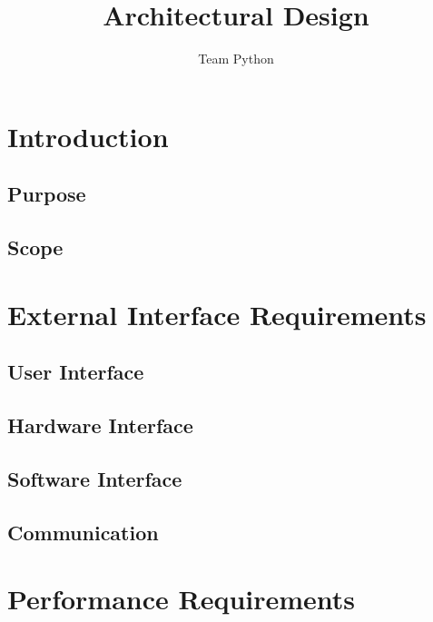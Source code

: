 \documentclass[11pt]{article}
\author{Team Python}
\title{Architectural Design}
\begin{document}
	\setlength{\parskip}{6pt}
	
	\tableofcontents
	\newpage
	
	\section{Introduction}
    \subsection{Purpose}
	\subsection{Scope}
	
	\section{External Interface Requirements}
	\subsection{User Interface}
	\subsection{Hardware Interface}
	\subsection{Software Interface}
	\subsection{Communication}
	
	\section{Performance Requirements}
\end{document}
